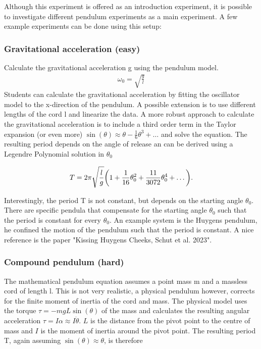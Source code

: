 \documentclass{article}
\begin{document}
Although this experiment is offered as an introduction experiment, it is possible to investigate different pendulum experiments as a main experiment. A few example experiments can be done using this setup:

\subsubsection{Gravitational acceleration (easy)}
Calculate the gravitational acceleration g using the pendulum model. 
\begin{align}
    \omega_0 =\sqrt{\frac{g}{l}}
\end{align}
Students can calculate the gravitational acceleration by fitting the oscillator model to the x-direction of the pendulum. A possible extension is to use different lengths of the cord l and linearize the data. A more robust approach to calculate the gravitational acceleration is to include a third order term in the Taylor expansion (or even more) $\sin(\theta)\approx\theta - \frac{1}{6}\theta^3 +\dots$ and solve the equation. The resulting period depends on the angle of release an can be derived using a Legendre Polynomial solution in $\theta_0$

\begin{align}
    T = 2\pi \sqrt{\frac{l}{g}}\bigg{(}1+\frac{1}{16}\theta_0^2 + \frac{11}{3072}\theta_0^4 + \dots\bigg{)}.
\end{align}

Interestingly, the period T is not constant, but depends on the starting angle $\theta_0$. There are specific pendula that compensate for the starting angle $\theta_0$ such that the period is constant for every $\theta_0$. An example system is the Huygens pendulum, he confined the motion of the pendulum such that the period is constant. A nice reference is the paper "Kissing Huygens Cheeks, Schut et al. 2023".

\subsubsection{Compound pendulum (hard)}
The mathematical pendulum equation
assumes a point mass m and a massless cord of length l. This is not very realistic, a physical pendulum however, corrects for the finite moment of inertia of the cord and mass. The physical model uses the torque $\tau = -mgL\sin(\theta)$ of the mass and calculates the resulting angular acceleration $\tau =I\alpha \approx I\ddot{\theta}$. $L$ is the distance from the pivot point to the centre of mass and $I$ is the moment of inertia around the pivot point. The resulting period T, again assuming $\sin(\theta)\approx\theta$, is therefore
\end{document}
